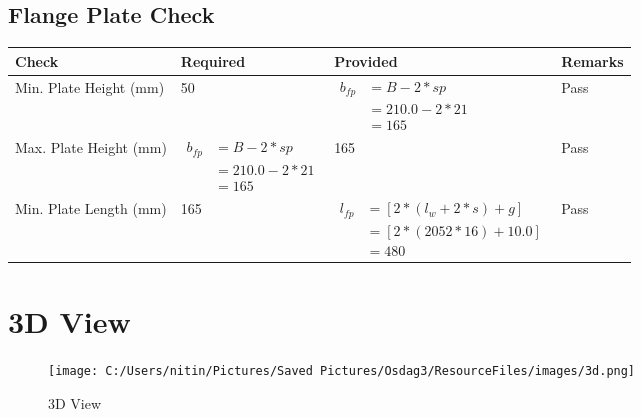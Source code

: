\documentclass{article}%
\begin{document}
%
\newpage%
\subsection{Flange Plate Check}%
\label{subsec:FlangePlateCheck}%
\renewcommand{\arraystretch}{1.2}%
\begin{longtable}{|p{4cm}|p{6cm}|p{5.5cm}|p{1.5cm}|}%
\hline%
\rowcolor{OsdagGreen}%
Check&Required&Provided&Remarks\\%
\hline%
\endhead%
\hline%
Min. Plate Height (mm)&50&$\begin{aligned} b_{fp} &= {B - 2*sp} \\ &= {210.0 - 2 * 21} \\ &=165\end{aligned}$&Pass\\%
\hline%
Max. Plate Height (mm)&$\begin{aligned} b_{fp} &= {B - 2*sp} \\ &= {210.0 - 2 * 21} \\ &=165\end{aligned}$&165&Pass\\%
\hline%
Min. Plate Length (mm)&165&$\begin{aligned} l_{fp} & = [2*(l_{w} + 2*s) + g]\\ &= [2*(2052*16) +10.0]\\ &=480\end{aligned}$&Pass\\%
\hline%
\end{longtable}

%
%
\newpage%
\section{3D View}%
\label{sec:3DView}%


\begin{figure}[h!]%
\centering%
\texttt{[image: C:/Users/nitin/Pictures/Saved Pictures/Osdag3/ResourceFiles/images/3d.png]}%
\caption{3D View}%
\end{figure}

%
\end{document}
